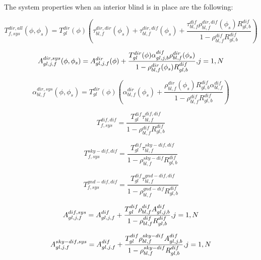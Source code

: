 The system properties when an interior blind is in place are the following:

\begin{equation}
T_{f,sys}^{dir,all}(\phi ,{\phi_s}) = T_{gl}^{dir}(\phi )\left( {\tau_{bl,f}^{dir,dir}({\phi_s}) + \tau_{bl,f}^{dir,dif}({\phi_s}) + \frac{{\tau_{bl,f}^{dif}\rho_{bl,f}^{dir,dif}({\phi_s})R_{gl,b}^{dif}}}{{1 - \rho_{bl,f}^{dif}R_{gl,b}^{dif}}}} \right)
\end{equation}

\begin{equation}
A_{gl,j,f}^{dir,sys}(\phi ,{\phi_s}) = A_{gl,j,f}^{dir}(\phi ) + \frac{{T_{gl}^{dir}(\phi )\alpha_{gl,j,b}^{dif}\rho_{bl,f}^{dir}({\phi_s})}}{{1 - \rho_{bl,f}^{dir}({\phi_s})R_{gl,b}^{dif}}}{\rm{,    }}j = 1,N
\end{equation}

\begin{equation}
\alpha_{bl,f}^{dir,sys}(\phi ,{\phi_s}) = T_{gl}^{dir}(\phi )\left( {\alpha_{bl,f}^{dir}({\phi_s}) + \frac{{\rho_{bl,f}^{dir}({\phi_s})R_{gl,b}^{dif}\alpha_{bl,f}^{dif}}}{{1 - \rho_{bl,f}^{dif}R_{gl,b}^{dif}}}} \right)
\end{equation}

\begin{equation}
T_{f,sys}^{dif,dif} = \frac{{T_{gl}^{dif}\tau_{bl,f}^{dif,dif}}}{{1 - \rho_{bl,f}^{dif}R_{gl,b}^{dif}}}
\end{equation}

\begin{equation}
T_{f,sys}^{sky - dif,dif} = \frac{{T_{gl}^{dif}\tau_{bl,f}^{sky - dif,dif}}}{{1 - \rho_{bl,f}^{sky - dif}R_{gl,b}^{dif}}}
\end{equation}

\begin{equation}
T_{f,sys}^{gnd - dif,dif} = \frac{{T_{gl}^{dif}\tau_{bl,f}^{gnd - dif,dif}}}{{1 - \rho_{bl,f}^{gnd - dif}R_{gl,b}^{dif}}}
\end{equation}

\begin{equation}
A_{gl,j,f}^{dif,sys} = A_{gl,j,f}^{dif} + \frac{{T_{gl}^{dif}\rho_{bl,f}^{dif}A_{gl,j,b}^{dif}}}{{1 - \rho_{bl,f}^{dif}R_{gl,b}^{dif}}}{\rm{,    }}j = 1,N
\end{equation}

\begin{equation}
A_{gl,j,f}^{sky - dif,sys} = A_{gl,j,f}^{dif} + \frac{{T_{gl}^{dif}\rho_{bl,f}^{sky - dif}A_{gl,j,b}^{dif}}}{{1 - \rho_{bl,f}^{sky - dif}R_{gl,b}^{dif}}}{\rm{,    }}j = 1,N
\end{equation}

